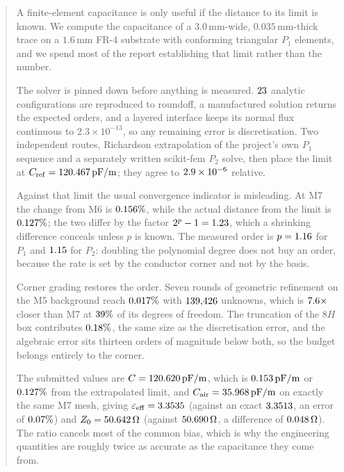 \documentclass[11pt]{article}
\newcommand{\epseff}{\varepsilon_{\mathrm{eff}}}
\newcommand{\Cair}{C_{\mathrm{air}}}   %
\newcommand{\Zzero}{Z_0}
\begin{document}
\begin{abstract}
A finite-element capacitance is only useful if the distance to its limit is known.
We compute the capacitance of a $3.0\,\mathrm{mm}$-wide, $0.035\,\mathrm{mm}$-thick trace on
a $1.6\,\mathrm{mm}$ FR-4 substrate with conforming triangular $P_1$ elements, and we spend
most of the report establishing that limit rather than the number.

The solver is pinned down before anything is measured. $\CheckCount$ analytic
configurations are reproduced to roundoff, a manufactured solution returns the expected
orders, and a layered interface keeps its normal flux continuous to $2.3\times10^{-13}$,
so any remaining error is discretisation. Two independent routes, Richardson extrapolation
of the project's own $P_1$ sequence and a separately written scikit-fem $P_2$ solve, then
place the limit at $C_{\mathrm{ref}}=\CRef\,\mathrm{pF/m}$; they agree to
$\RefAgree$ relative.

Against that limit the usual convergence indicator is misleading. At M7 the change from
M6 is $\DeltaSeven\%$, while the actual distance from the limit is $\ErrSeven\%$; the two
differ by the factor $2^{p}-1=\RatioChange$, which a shrinking difference conceals
unless $p$ is known. The measured order is $p=\OrderPOne$ for $P_1$ and $\OrderPTwo$ for
$P_2$: doubling the polynomial degree does not buy an order, because the rate is set by the
conductor corner and not by the basis.

Corner grading restores the order. Seven rounds of geometric refinement on the M5
background reach $\GradedErr\%$ with $\GradedDof$ unknowns, which is
$\GradedRatio\times$ closer than M7 at $\GradedDofFrac\%$ of its degrees of freedom. The
truncation of the $8H$ box contributes $\TruncEight\%$, the same size as the
discretisation error, and the algebraic error sits thirteen orders of magnitude below
both, so the budget belongs entirely to the corner.

The submitted values are $C=\CFinal\,\mathrm{pF/m}$, which is $\CFinalAbs\,\mathrm{pF/m}$
or $\ErrSeven\%$ from the extrapolated limit, and $\Cair=\CAir\,\mathrm{pF/m}$ on exactly
the same M7 mesh, giving
$\epseff=\EpsEff$ (against an exact $\EpsRef$, an error of $\EpsErr\%$) and
$\Zzero=\ZFinal\,\Omega$ (against $\ZRef\,\Omega$, a difference of
$\ZErrAbs\,\Omega$). The ratio cancels most of the common bias, which is why the
engineering quantities are roughly twice as accurate as the capacitance they come from.
\end{abstract}
\tableofcontents
\newpage
{}
\end{document}
